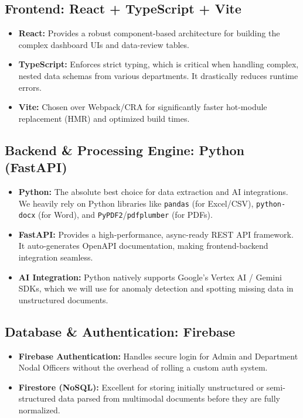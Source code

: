 \documentclass[11pt,a4paper]{article}
\begin{document}
\subsection{Frontend: React + TypeScript + Vite}
\begin{itemize}[leftmargin=*]
    \item \textbf{React:} Provides a robust component-based architecture for building the complex dashboard UIs and data-review tables.
    \item \textbf{TypeScript:} Enforces strict typing, which is critical when handling complex, nested data schemas from various departments. It drastically reduces runtime errors.
    \item \textbf{Vite:} Chosen over Webpack/CRA for significantly faster hot-module replacement (HMR) and optimized build times.
\end{itemize}

\subsection{Backend \& Processing Engine: Python (FastAPI)}
\begin{itemize}[leftmargin=*]
    \item \textbf{Python:} The absolute best choice for data extraction and AI integrations. We heavily rely on Python libraries like \texttt{pandas} (for Excel/CSV), \texttt{python-docx} (for Word), and \texttt{PyPDF2}/\texttt{pdfplumber} (for PDFs).
    \item \textbf{FastAPI:} Provides a high-performance, async-ready REST API framework. It auto-generates OpenAPI documentation, making frontend-backend integration seamless.
    \item \textbf{AI Integration:} Python natively supports Google's Vertex AI / Gemini SDKs, which we will use for anomaly detection and spotting missing data in unstructured documents.
\end{itemize}

\subsection{Database \& Authentication: Firebase}
\begin{itemize}[leftmargin=*]
    \item \textbf{Firebase Authentication:} Handles secure login for Admin and Department Nodal Officers without the overhead of rolling a custom auth system.
    \item \textbf{Firestore (NoSQL):} Excellent for storing initially unstructured or semi-structured data parsed from multimodal documents before they are fully normalized.
\end{itemize}
\end{document}
